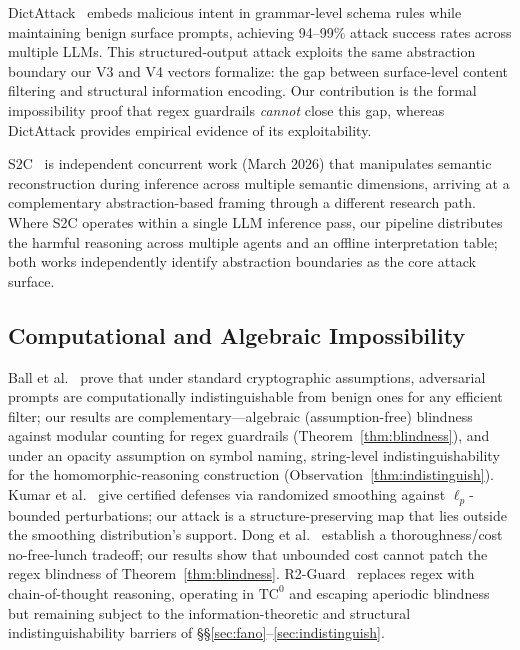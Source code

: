 \documentclass[letterpaper,twocolumn,10pt]{article}
\theoremstyle{definition}
\theoremstyle{remark}
\begin{document}
DictAttack~\cite{dictattack2025} embeds malicious intent in grammar-level schema rules
while maintaining benign surface prompts, achieving 94--99\% attack success rates across
multiple LLMs.
This structured-output attack exploits the same abstraction boundary our V3 and V4 vectors
formalize: the gap between surface-level content filtering and structural information
encoding.
Our contribution is the formal impossibility proof that regex guardrails \emph{cannot}
close this gap, whereas DictAttack provides empirical evidence of its exploitability.

S2C~\cite{s2c2026} is independent concurrent work (March 2026) that manipulates
semantic reconstruction during inference across multiple semantic dimensions,
arriving at a complementary abstraction-based framing through a different research
path.
Where S2C operates within a single LLM inference pass, our pipeline distributes
the harmful reasoning across multiple agents and an offline interpretation table;
both works independently identify abstraction boundaries as the core attack surface.

\subsection{Computational and Algebraic Impossibility}\label{sec:related-impossibility}

Ball et al.~\cite{ball2025impossibility} prove that under standard
cryptographic assumptions, adversarial prompts are computationally
indistinguishable from benign ones for any efficient filter; our results
are complementary---algebraic (assumption-free) blindness against modular
counting for regex guardrails (Theorem~\ref{thm:blindness}), and under
an opacity assumption on symbol naming, string-level indistinguishability
for the homomorphic-reasoning construction
(Observation~\ref{thm:indistinguish}).
Kumar et al.~\cite{certifying_safety2023} give certified defenses via
randomized smoothing against $\ell_p$-bounded perturbations; our attack is
a structure-preserving map that lies outside the smoothing distribution's
support.
Dong et al.~\cite{nfl_guardrails2025} establish a thoroughness/cost
no-free-lunch tradeoff; our results show that unbounded cost cannot
patch the regex blindness of Theorem~\ref{thm:blindness}.
R2-Guard~\cite{r2guard2025} replaces regex with chain-of-thought
reasoning, operating in $\mathrm{TC}^0$ and escaping aperiodic blindness
but remaining subject to the information-theoretic and structural
indistinguishability barriers of
\S\S\ref{sec:fano}--\ref{sec:indistinguish}.
\end{document}
